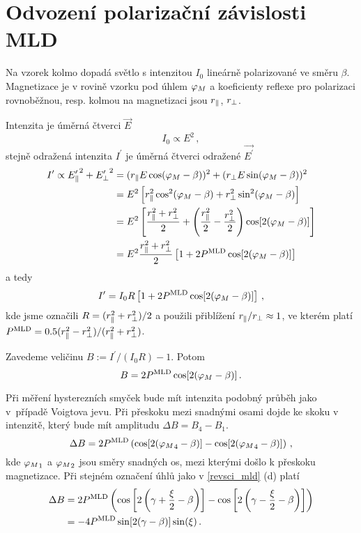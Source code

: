 \section{Odvození polarizační závislosti MLD} \label{odvozeni_mld}
Na vzorek kolmo dopadá světlo s intenzitou $I_0$ lineárně polarizované ve směru $\beta$. Magnetizace je v rovině vzorku pod úhlem $\varphi_M$ a koeficienty reflexe pro polarizaci rovnoběžnou, resp. kolmou na magnetizaci jsou $r_\parallel$, $r_\perp$.

Intenzita je úměrná čtverci $\vec{E}$
\begin{equation}
I_0 \propto E^2 \,,
\end{equation}
stejně odražená intenzita $I^\prime$ je úměrná čtverci odražené $\vec{E^\prime}$
\begin{equation}
\begin{aligned}
I^\prime \propto {E^\prime_\parallel}^2 + {E^\prime_\perp}^2 &= ({r_\parallel E \cos(\varphi_M-\beta)})^2+({r_\perp E \sin(\varphi_M-\beta)})^2 \\
&=E^2 \left[r_\parallel^2 \cos^2(\varphi_M-\beta)+ r_\perp^2 \sin^2(\varphi_M-\beta)\right] \\
&=E^2 \left[ \frac{r_\parallel^2+r_\perp^2}{2}  +  \left( \frac{r_\parallel^2}{2} - \frac{r_\perp^2}{2}\right) \cos[2(\varphi_M-\beta)]\right] \\
&=E^2 \frac{r_\parallel^2+r_\perp^2}{2} \left[1 + 2P^{\text{MLD}} \cos[2(\varphi_M-\beta)]\right]
\end{aligned}
\end{equation}
a tedy
\begin{equation}
I^\prime=I_0 R \left[1 + 2P^{\text{MLD}} \cos[2(\varphi_M-\beta)]\right] \,,
\end{equation}
kde jsme označili $R=(r_\parallel^2+r_\perp^2)/2$ a použili přiblížení $r_\parallel /r_\perp \approx 1$, ve kterém platí $P^{\text{MLD}} =\num{0,5}(r_\parallel^2-r_\perp^2)/(r_\parallel^2+r_\perp^2)$.

Zavedeme veličinu $B:=I^\prime/(I_0R)-1$. Potom
\begin{equation}
B=2P^{\text{MLD}} \cos[2(\varphi_M-\beta)] \,.
\end{equation}

Při měření hysterezních smyček bude mít intenzita podobný průběh jako v~případě Voigtova jevu. Při přeskoku mezi snadnými osami dojde ke skoku v intenzitě, který bude mít amplitudu $\Delta B=B_4-B_1$.
\begin{equation}
\Delta B=2 P^{\text{MLD}} \left( \cos[2({\varphi_M}_4-\beta)] -\cos[2({\varphi_M}_4-\beta)] \right) \,,
\end{equation}
kde ${\varphi_M}_1$ a ${\varphi_M}_2$ jsou směry snadných os, mezi kterými došlo k přeskoku magnetizace. Při stejném označení úhlů jako v \ref{revsci_mld} (d) platí
\begin{equation}
\begin{aligned}
\Delta B &=2 P^{\text{MLD}} \left( \cos\left[2\left(\gamma+\frac{\xi}{2}-\beta\right)\right] -\cos\left[2\left(\gamma-\frac{\xi}{2}-\beta\right)\right] \right) \\
&=-4P^{\text{MLD}}  \sin[2(\gamma-\beta)]\sin(\xi) \,.
\end{aligned}
\end{equation}
